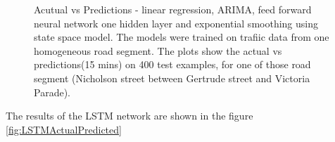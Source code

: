 \begin{figure}[h]
    \caption[Acutual vs Predictions, using currently popular methods]{Acutual vs Predictions -
    linear regression, ARIMA, feed forward neural network one hidden layer and exponential
    smoothing using state space model. The models were trained on trafiic data from one homogeneous
    road segment. The plots show the actual vs predictions(15 mins) on 400 test examples, for one
    of those road segment (Nicholson street between Gertrude street and Victoria Parade).}
    \label{fig:benchmarkModels}
\end{figure}

The results of the LSTM network are shown in the figure \ref{fig:LSTMActualPredicted}

\begin{figure}[h]
    \centering


    \qquad

    \qquad


\end{figure}
